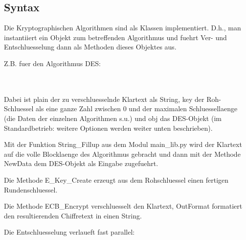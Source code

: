 \subsection{Syntax}

Die Kryptographischen Algorithmen sind als Klassen implementiert.
D.h., man instantiiert ein Objekt zum betreffenden Algorithmus
und fuehrt Ver- und Entschluesselung dann als Methoden dieses
Objektes aus.

Z.B. fuer den Algorithmus DES: 

 \\

 \\

Dabei ist plain der zu verschluesselnde Klartext als String,
key der Roh-Schluessel als eine ganze Zahl zwischen 0 und
der maximalen Schluessellaenge (die Daten der einzelnen Algorithmen s.u.)
und obj das DES-Objekt (im Standardbetrieb: weitere Optionen werden
weiter unten beschrieben).

Mit der Funktion String\_Fillup aus dem Modul main\_lib.py wird der
Klartext auf die volle Blocklaenge des Algorithmus gebracht und dann
mit der Methode NewData dem DES-Objekt als Eingabe zugefuehrt.

Die Methode E\_Key\_Create erzeugt aus dem Rohschluessel einen 
fertigen Rundenschluessel.

Die Methode ECB\_Encrypt verschluesselt den Klartext, OutFormat
formatiert den resultierenden Chiffretext in einen String.

Die Entschluesselung verlaueft fast parallel:

 \\

